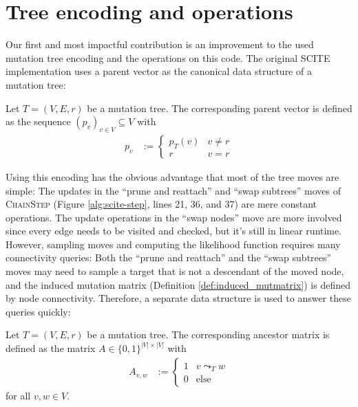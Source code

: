 \section{Tree encoding and operations}

Our first and most impactful contribution is an improvement to the used mutation tree encoding and the operations on this code. The original \ac{SCITE} implementation \cite{tree2016} uses a parent vector as the canonical data structure of a mutation tree:

\begin{definition}
    \label{def:parent_vector}
    Let $T = (V, E, r)$ be a mutation tree. The corresponding parent vector is defined as the sequence $(p_v)_{v \in V} \subseteq V$ with
    \begin{align*}
        p_v &:= \begin{cases}
            p_T(v) & v \neq r \\
            r & v = r 
        \end{cases}
    \end{align*}
\end{definition}

Using this encoding has the obvious advantage that most of the tree moves are simple: The updates in the ``prune and reattach'' and ``swap subtrees'' moves of \textsc{ChainStep} (Figure \ref{alg:scite-step}, lines 21, 36, and 37) are mere constant operations. The update operations in the ``swap nodes'' move are more involved since every edge needs to be visited and checked, but it's still in linear runtime. However, sampling moves and computing the likelihood function requires many connectivity queries: Both the ``prune and reattach'' and the ``swap subtrees'' moves may need to sample a target that is not a descendant of the moved node, and the induced mutation matrix (Definition \ref{def:induced_mutmatrix}) is defined by node connectivity. Therefore, a separate data structure is used to answer these queries quickly:

\begin{definition}
    \label{def:ancestor_matrix}
    Let $T = (V, E, r)$ be a mutation tree. The corresponding ancestor matrix is defined as the matrix $A \in \{0,1\}^{|V| \times |V|}$ with
    \begin{align*}
        A_{v,w} &:= \begin{cases}
            1 & v \leadsto_T w \\
            0 & \text{else}
        \end{cases}
    \end{align*}
    for all $v, w \in V$.
\end{definition}

